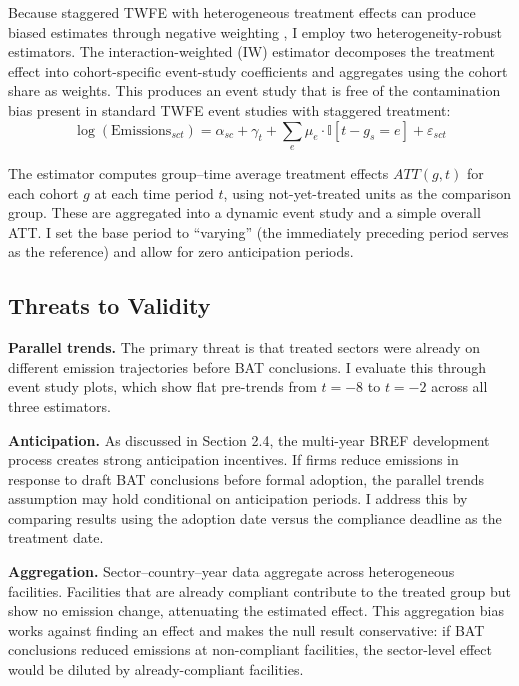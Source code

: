 \documentclass[12pt]{article}
\newcommand{\ind}{\mathbb{I}}
\begin{document}
Because staggered TWFE with heterogeneous treatment effects can produce biased estimates through negative weighting \citep{goodmanbacon2021}, I employ two heterogeneity-robust estimators. The \citet{sunabraham2021} interaction-weighted (IW) estimator decomposes the treatment effect into cohort-specific event-study coefficients and aggregates using the cohort share as weights. This produces an event study that is free of the contamination bias present in standard TWFE event studies with staggered treatment:
\begin{equation}
\log(\text{Emissions}_{sct}) = \alpha_{sc} + \gamma_t + \sum_{e} \mu_e \cdot \ind[t - g_s = e] + \varepsilon_{sct}
\label{eq:sa}
\end{equation}

The \citet{callanaysantanna2021} estimator computes group--time average treatment effects $ATT(g,t)$ for each cohort $g$ at each time period $t$, using not-yet-treated units as the comparison group. These are aggregated into a dynamic event study and a simple overall ATT. I set the base period to ``varying'' (the immediately preceding period serves as the reference) and allow for zero anticipation periods.

\subsection{Threats to Validity}

\textbf{Parallel trends.} The primary threat is that treated sectors were already on different emission trajectories before BAT conclusions. I evaluate this through event study plots, which show flat pre-trends from $t = -8$ to $t = -2$ across all three estimators.

\textbf{Anticipation.} As discussed in Section 2.4, the multi-year BREF development process creates strong anticipation incentives. If firms reduce emissions in response to draft BAT conclusions before formal adoption, the parallel trends assumption may hold conditional on anticipation periods. I address this by comparing results using the adoption date versus the compliance deadline as the treatment date.

\textbf{Aggregation.} Sector--country--year data aggregate across heterogeneous facilities. Facilities that are already compliant contribute to the treated group but show no emission change, attenuating the estimated effect. This aggregation bias works against finding an effect and makes the null result conservative: if BAT conclusions reduced emissions at non-compliant facilities, the sector-level effect would be diluted by already-compliant facilities.
\end{document}
